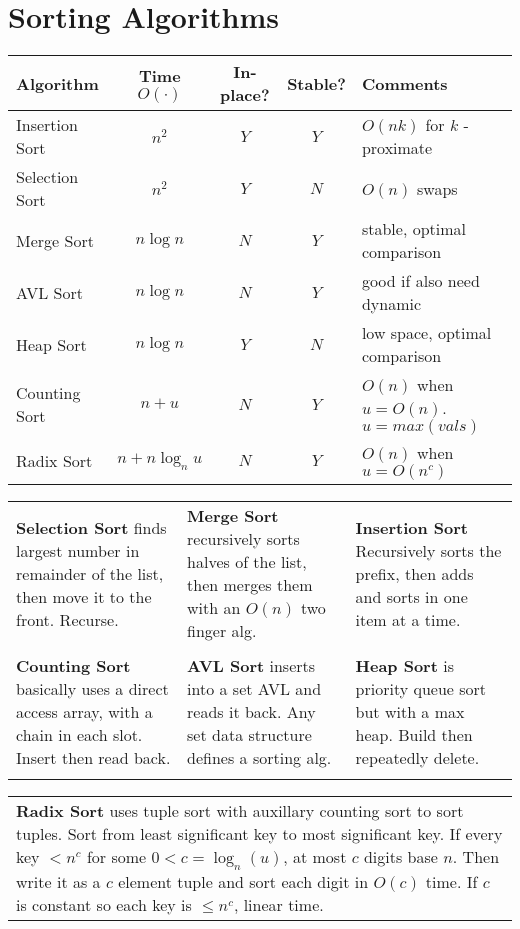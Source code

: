 \documentclass{article}
\begin{document}
\section{Sorting Algorithms}

\begin{center}
    \begin{tabular}{l||c|c|c|l||} 
        Algorithm & Time $O(\cdot)$ & In-place? & Stable? & Comments \\
        \hline \hline Insertion Sort & $n^{2}$ & $Y$ & $Y$ & $O(n k)$ for $k$ -proximate \\
        \hline Selection Sort & $n^{2}$ & $Y$ & $N$ & $O(n)$ swaps \\
        \hline Merge Sort & $n \log n$ & $N$ & $Y$ & stable, optimal comparison \\
        \hline AVL Sort & $n \log n$ & $N$ & $Y$ & good if also need dynamic \\
        \hline Heap Sort & $n \log n$ & $Y$ & $N$ & low space, optimal comparison \\
        \hline Counting Sort & $n+u$ & $N$ & $Y$ & $O(n)$ when $u=O(n)$. $u=max(vals)$ \\
        \hline Radix Sort & $n+n \log _{n} u$ & $N$ & $Y$ & $O(n)$ when $u=O\left(n^{c}\right)$ \\
        \hline
    \end{tabular}
\end{center}

\noindent\begin{tabularx}{\textwidth}{XXX}
    \textbf{Selection Sort} finds largest number in remainder of the list, then move it to the front. Recurse. & 
    \textbf{Merge Sort} recursively sorts halves of the list, then merges them with an $O(n)$ two finger alg. &
    \textbf{Insertion Sort} Recursively sorts the prefix, then adds and sorts in one item at a time. \\ \\
    \textbf{Counting Sort} basically uses a direct access array, with a chain in each slot. Insert then read back. &
    \textbf{AVL Sort} inserts into a set AVL and reads it back. Any set data structure defines a sorting alg. &
    \textbf{Heap Sort} is priority queue sort but with a max heap. Build then repeatedly delete. \\ \\
\end{tabularx}

\noindent\begin{tabularx}{\textwidth}{X}
    \textbf{Radix Sort} uses tuple sort with auxillary counting sort to sort tuples. Sort from least significant key to most significant key. If every key $< n^c$ for some $0<c=\log_n(u)$, at most $c$ digits base $n$. Then write it as a $c$ element tuple and sort each digit in $O(c)$ time. If $c$ is constant so each key is $\leq n^c$, linear time.
\end{tabularx}
\end{document}
